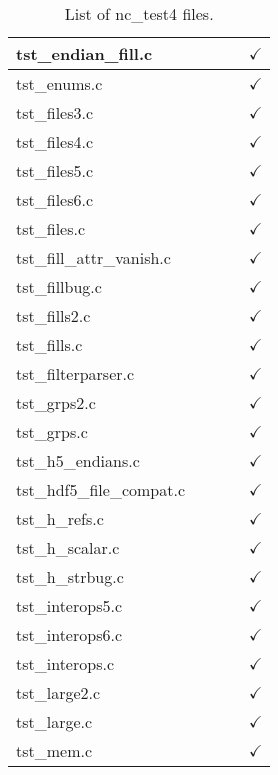 \begin{table}[H]
\begin{tabular}{|l|c|c|c|c|}
tst\_endian\_fill.c   &  &   &   & $\checkmark$    \\ \hline
tst\_enums.c   &  &   &   & $\checkmark$    \\ \hline
tst\_files3.c   &  &   &   & $\checkmark$    \\ \hline
tst\_files4.c   &  &   &   & $\checkmark$    \\ \hline
tst\_files5.c   &  &   &   & $\checkmark$    \\ \hline
tst\_files6.c   &  &   &   & $\checkmark$    \\ \hline
tst\_files.c   &  &   &   & $\checkmark$    \\ \hline
tst\_fill\_attr\_vanish.c   &  &   &   & $\checkmark$    \\ \hline
tst\_fillbug.c   &  &   &   & $\checkmark$    \\ \hline
tst\_fills2.c   &  &   &   & $\checkmark$    \\ \hline
tst\_fills.c   &  &   &   & $\checkmark$    \\ \hline
tst\_filterparser.c   &  &   &   & $\checkmark$    \\ \hline
tst\_grps2.c   &  &   &   & $\checkmark$    \\ \hline
tst\_grps.c   &  &   &   & $\checkmark$    \\ \hline
tst\_h5\_endians.c   &  &   &   & $\checkmark$    \\ \hline
tst\_hdf5\_file\_compat.c   &  &   &   & $\checkmark$    \\ \hline
tst\_h\_refs.c   &  &   &   & $\checkmark$    \\ \hline
tst\_h\_scalar.c   &  &   &   & $\checkmark$    \\ \hline
tst\_h\_strbug.c   &  &   &   & $\checkmark$    \\ \hline
tst\_interops5.c   &  &   &   & $\checkmark$    \\ \hline
tst\_interops6.c   &  &   &   & $\checkmark$    \\ \hline
tst\_interops.c   &  &   &   & $\checkmark$    \\ \hline
tst\_large2.c   &  &   &   & $\checkmark$    \\ \hline
tst\_large.c   &  &   &   & $\checkmark$    \\ \hline
tst\_mem.c   &  &   &   & $\checkmark$    \\ \hline
\hline
\end{tabular}
\caption{List of nc\_test4 files.}
\end{table}

